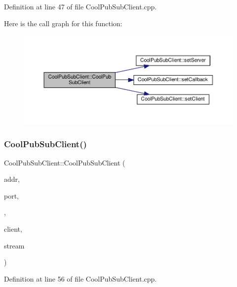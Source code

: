 Definition at line 47 of file Cool\+Pub\+Sub\+Client.\+cpp.

Here is the call graph for this function\+:\nopagebreak
\begin{figure}[H]
\begin{center}
\leavevmode
\includegraphics[width=350pt]{class_cool_pub_sub_client_a1743a9eeef19b3b6ff1db5be8df55a9c_cgraph}
\end{center}
\end{figure}
\mbox{\label{class_cool_pub_sub_client_a0797679d710bf2b1aa802107bdb1a2fe}} 
\subsubsection{\texorpdfstring{Cool\+Pub\+Sub\+Client()}{CoolPubSubClient()}\hspace{0.1cm}{\footnotesize\ttfamily [6/14]}}
{\footnotesize\ttfamily Cool\+Pub\+Sub\+Client\+::\+Cool\+Pub\+Sub\+Client (\begin{DoxyParamCaption}\item[{I\+P\+Address}]{addr,  }\item[{uint16\+\_\+t}]{port,  }\item[{\hyperlink{class_cool_pub_sub_client_a021ec75e9fbaf658370b8005ccfddc14}{M\+Q\+T\+T\+\_\+\+C\+A\+L\+L\+B\+A\+C\+K\+\_\+\+S\+I\+G\+N\+A\+T\+U\+RE}}]{,  }\item[{Client \&}]{client,  }\item[{Stream \&}]{stream }\end{DoxyParamCaption})}



Definition at line 56 of file Cool\+Pub\+Sub\+Client.\+cpp.

